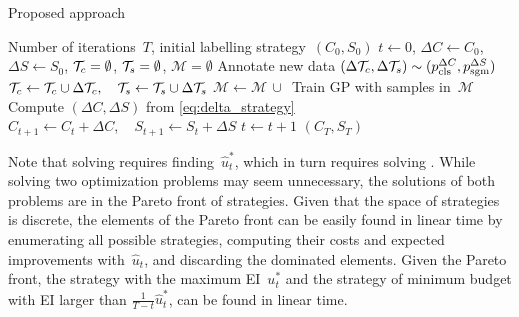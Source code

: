 \begin{algorithm}[t]
\caption{Proposed approach}
\label{alg:the_algorithm}
\begin{algorithmic}[1]
\Require Number of iterations~$T$, initial labelling strategy~$(C_0, S_0)$
\State $t\leftarrow 0$, $\Delta{}C\leftarrow C_0$, $\Delta{}S\leftarrow S_0$, $\mathcal{T}_c=\emptyset$, $\mathcal{T}_s=\emptyset$, $\mathcal{M}=\emptyset$
\State Annotate new data $(\Delta{}\mathcal{T}_c,\Delta{}\mathcal{T}_s)\sim{}(p_\textrm{cls}^{\Delta{}C}, p_\textrm{sgm}^{\Delta{}S})$
\State $\mathcal{T}_c \leftarrow \mathcal{T}_c \cup \Delta{}\mathcal{T}_c, \quad \mathcal{T}_s \leftarrow \mathcal{T}_s \cup \Delta{}\mathcal{T}_s$ 
\State $\mathcal{M} \leftarrow \mathcal{M} \,\cup\,$ %
\State Train GP with samples in~$\mathcal{M}$
\State Compute $(\Delta{}C, \Delta{}S)$ from \cref{eq:delta_strategy}
\State $C_{t+1} \leftarrow C_t + \Delta{}C, \quad S_{t+1} \leftarrow S_t + \Delta{}S$
\State $t\leftarrow t+1$
\EndWhile
\Ensure $(C_T, S_T)$
\end{algorithmic}
\end{algorithm}

Note that solving  requires finding~$\hat{u}_t^*$, which in turn requires solving . While solving two optimization problems may seem unnecessary, the solutions of both problems are in the Pareto front of strategies. Given that the space of strategies is discrete, the elements of the Pareto front can be easily found in linear time by enumerating all possible strategies, computing their costs and expected improvements with~$\hat{u}_t$, and discarding the dominated elements. Given the Pareto front, the strategy with the maximum EI~$u^*_t$ and the strategy of minimum budget with EI larger than $\frac{1}{T - t}\hat{u}^*_t$, can be found in linear time.
